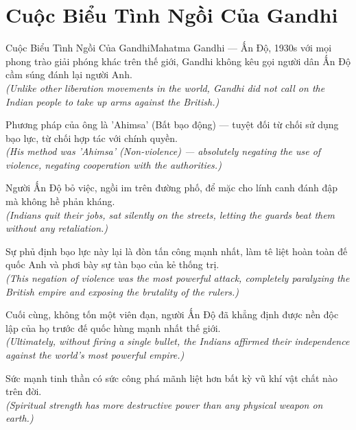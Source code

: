 \section{Cuộc Biểu Tình Ngồi Của Gandhi}
\begin{truyen}{Cuộc Biểu Tình Ngồi Của Gandhi}{Mahatma Gandhi --- Ấn Độ, 1930s}
 với mọi phong trào giải phóng khác trên thế giới, Gandhi không kêu gọi người dân Ấn Độ cầm súng đánh lại người Anh.\\[4pt]
\textit{(Unlike other liberation movements in the world, Gandhi did not call on the Indian people to take up arms against the British.)}

Phương pháp của ông là 'Ahimsa' (Bất bạo động) --- tuyệt đối từ chối sử dụng bạo lực, từ chối hợp tác với chính quyền.\\[4pt]
\textit{(His method was 'Ahimsa' (Non-violence) --- absolutely negating the use of violence, negating cooperation with the authorities.)}

Người Ấn Độ bỏ việc, ngồi im trên đường phố, để mặc cho lính canh đánh đập mà không hề phản kháng.\\[4pt]
\textit{(Indians quit their jobs, sat silently on the streets, letting the guards beat them without any retaliation.)}

Sự phủ định bạo lực này lại là đòn tấn công mạnh nhất, làm tê liệt hoàn toàn đế quốc Anh và phơi bày sự tàn bạo của kẻ thống trị.\\[4pt]
\textit{(This negation of violence was the most powerful attack, completely paralyzing the British empire and exposing the brutality of the rulers.)}

Cuối cùng, không tốn một viên đạn, người Ấn Độ đã khẳng định được nền độc lập của họ trước đế quốc hùng mạnh nhất thế giới.\\[4pt]
\textit{(Ultimately, without firing a single bullet, the Indians affirmed their independence against the world's most powerful empire.)}

\end{truyen}
\begin{baihoc}
  Sức mạnh tinh thần có sức công phá mãnh liệt hơn bất kỳ vũ khí vật chất nào trên đời.\\[4pt]
  \textit{(Spiritual strength has more destructive power than any physical weapon on earth.)}
\end{baihoc}
